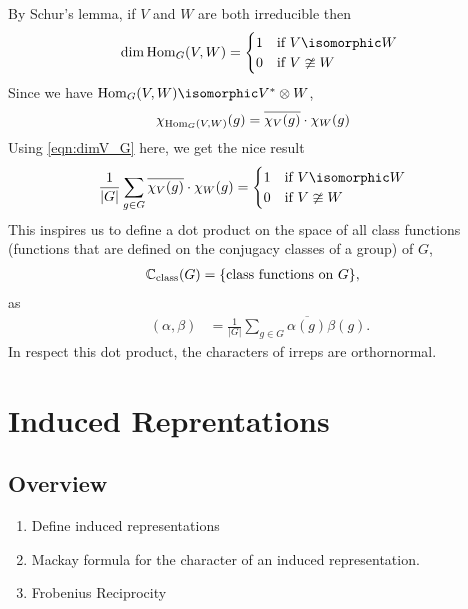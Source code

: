 By Schur's lemma, if $V$ and $W$ are both irreducible then
\begin{equation}
    \dim \Hom_G(V,W) = 
        \begin{cases}    
            1   &\text{if } V\isomorphic W \\
            0   &\text{if } V\ncong  W
        \end{cases}
\end{equation}
Since we have $\Hom_G(V,W)\isomorphic V^*\otimes W$,
\begin{align}
    \chi_{\operatorname{Hom}_G(V,W)}(g) &= \overline{\chi_V(g)}\cdot\chi_W(g)
\end{align}
Using \eqref{eqn:dimV_G} here, we get the nice result
\begin{align}
        \frac{1}{|G|}\sum_{g\in G} \overline{\chi_V(g)}\cdot\chi_W(g) 
        &= \begin{cases}    
            1   &\text{if } V\isomorphic W \\
            0   &\text{if } V\ncong  W
        \end{cases}
\end{align}
This inspires us to define a dot product on the space of all class functions (functions that are defined on the conjugacy classes of a group) of $G$,
\begin{align}
    \mathbb{C}_{\text{class}}(G) &= \{\text{class functions on $G$}\},
\end{align}
as
\begin{align}
    (\alpha,\beta) &= \frac{1}{|G|} \sum_{g\in G} \overline{\alpha(g)} \beta(g).
    \label{eqn:dotproduct_classfunctions}
\end{align}
In respect this dot product, the characters of irreps are orthornormal.

\chapter{Induced Reprentations}
\label{cha:induced_reprentations}

\section{Overview}
\begin{enumerate}
    \makethislistcompact
    \item Define induced representations
    \item Mackay formula for the character of an induced representation.
    \item Frobenius Reciprocity
\end{enumerate}


